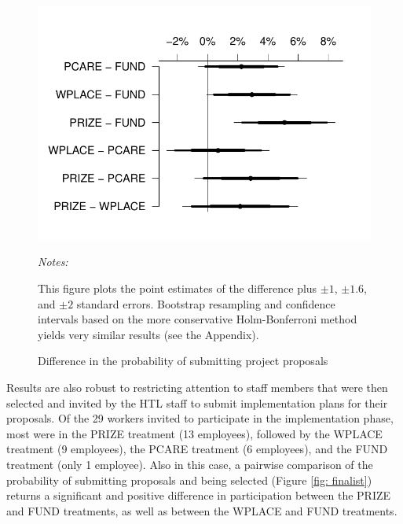 \documentclass[11pt, titlepage]{article}
\newenvironment{tablenotes}[1][]{
  \begin{minipage}{\textwidth}\emph{Notes:}{\footnotesize #1}
}{\end{minipage}}
\begin{document}
\begin{figure}
  \centering
  \caption{Difference in the probability of submitting project proposals}
  \label{fig: submitting}
  \includegraphics{Figures/cplot-1.pdf}
  \begin{tablenotes}
  This figure plots the point estimates of the difference plus $\pm 1$, $\pm 1.6$, and $\pm 2$ standard errors. Bootstrap resampling and confidence intervals based on the more conservative Holm-Bonferroni method yields very similar results (see the Appendix).
  \end{tablenotes}
\end{figure}

Results are also robust to restricting attention to staff members that
were then selected and invited by the HTL staff to submit implementation
plans for their proposals. Of the 29 workers invited to participate in
the implementation phase, most were in the PRIZE treatment (13
employees), followed by the WPLACE treatment (9 employees), the PCARE
treatment (6 employees), and the FUND treatment (only 1 employee). Also
in this case, a pairwise comparison of the probability of submitting
proposals and being selected (Figure \ref{fig: finalist}) returns a
significant and positive difference in participation between the PRIZE
and FUND treatments, as well as between the WPLACE and FUND treatments.
\end{document}
